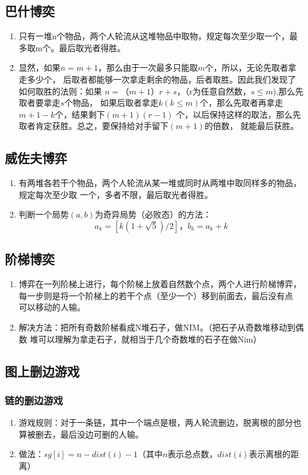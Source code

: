 \subsection{巴什博奕}
	\begin{enumerate}
		\item 
			只有一堆n个物品，两个人轮流从这堆物品中取物，规定每次至少取一个，最多取m个。最后取光者得胜。
		\item
			显然，如果$n=m+1$，那么由于一次最多只能取$m$个，所以，无论先取者拿走多少个，
			后取者都能够一次拿走剩余的物品，后者取胜。因此我们发现了如何取胜的法则：如果
			$n=（m+1）r+s$，（r为任意自然数，$s \leq m$),那么先取者要拿走$s$个物品，
			如果后取者拿走$k(k \leq m)$个，那么先取者再拿走$m+1-k$个，结果剩下$(m+1)(r-1)$
			个，以后保持这样的取法，那么先取者肯定获胜。总之，要保持给对手留下$(m+1)$的倍数，
			就能最后获胜。
	\end{enumerate}
\subsection{威佐夫博弈}
	\begin{enumerate}
		\item 
			有两堆各若干个物品，两个人轮流从某一堆或同时从两堆中取同样多的物品，规定每次至少取
			一个，多者不限，最后取光者得胜。
		\item
			判断一个局势$(a, b)$为奇异局势（必败态）的方法：
			$$a_k =[k (1+\sqrt{5})/2]，b_k= a_k + k$$
	\end{enumerate}
\subsection{阶梯博奕}
	\begin{enumerate}
		\item
			博弈在一列阶梯上进行，每个阶梯上放着自然数个点，两个人进行阶梯博弈，
			每一步则是将一个阶梯上的若干个点（至少一个）移到前面去，最后没有点
			可以移动的人输。
		\item
			解决方法：把所有奇数阶梯看成N堆石子，做NIM。（把石子从奇数堆移动到偶数
			堆可以理解为拿走石子，就相当于几个奇数堆的石子在做Nim）
	\end{enumerate}
\subsection{图上删边游戏}
	\subsubsection{链的删边游戏}
		\begin{enumerate}
			\item
				游戏规则：对于一条链，其中一个端点是根，两人轮流删边，脱离根的部分也算被删去，最后没边可删的人输。
			\item
				做法：$sg[i] = n - dist(i) - 1$（其中$n$表示总点数，$dist(i)$表示离根的距离）
		\end{enumerate}
